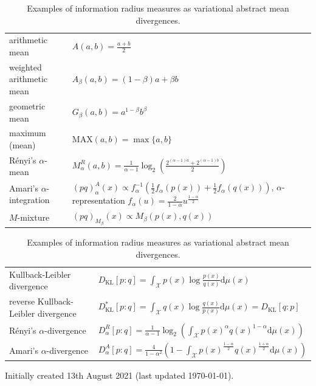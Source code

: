 \documentclass[11pt]{article}
\def\dmu{\mathrm{d}\mu}
\def\calX{\mathcal{X}}
\def\KL{\mathrm{KL}}
\def\calX{\mathcal{X}}
\def\dmu{\mathrm{d}\mu}
\def\KL{\mathrm{KL}}
\begin{document}
\begin{table}
\vskip 0.5cm

\begin{tabular}{ll}
arithmetic mean & $A(a,b)=\frac{a+b}{2}$\\
weighted arithmetic mean & $A_\beta(a,b)=(1-\beta)a+\beta b$\\
geometric mean & $G_\beta(a,b)=a^{1-\beta}b^\beta$\\
maximum (mean) & $\mathrm{MAX}(a,b)=\max\{a,b\}$\\
R\'enyi's $\alpha$-mean & $M_\alpha^R(a,b)=\frac{1}{\alpha-1}\log_2\left(\frac{2^{(\alpha-1)a}+2^{(\alpha-1)b}}{2}\right)$\\
Amari's $\alpha$-integration & $(pq)_\alpha^A(x)\propto f_\alpha^{-1}(\frac{1}{2}f_\alpha(p(x))+ \frac{1}{2}f_\alpha(q(x)))$, $\alpha$-representation $f_\alpha(u)=\frac{2}{1-\alpha}u^{\frac{1-\alpha}{2}}$\\
$M$-mixture  & $(pq)_{M_\beta}(x)\propto M_\beta(p(x),q(x))$
\end{tabular}

\vskip 0.5cm

\begin{tabular}{ll}
Kullback-Leibler divergence & $D_\KL[p:q]=\int_\calX p(x)\log\frac{p(x)}{q(x)}\dmu(x)$ \\
reverse Kullback-Leibler divergence & $D_\KL^*[p:q]=\int_\calX q(x)\log\frac{q(x)}{p(x)}\dmu(x)=D_\KL[q:p]$ \\
R\'enyi's $\alpha$-divergence & $D_\alpha^R[p:q]=\frac{1}{\alpha-1}\log_2\left( \int_\calX p(x)^\alpha q(x)^{1-\alpha}\dmu(x)\right)$\\
Amari's $\alpha$-divergence & 
$D_\alpha^A[p:q]=\frac{4}{1-\alpha^2}(1-\int_\calX p(x)^{\frac{1-\alpha}{2}}q(x)^{\frac{1+\alpha}{2}}\dmu(x))$
\end{tabular}

\caption{Examples of information radius measures as variational abstract mean divergences.}
\end{table}



\vskip 1cm
Initially created 13th August 2021 (last updated \today).



\end{document}
